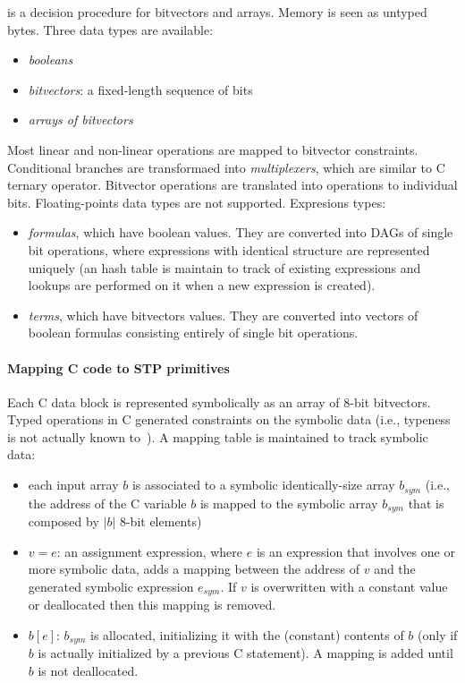 \cite{STP-TR07} is a decision procedure for bitvectors and arrays. Memory is seen as untyped bytes. Three data types are available:
\begin{itemize}
  \item {\em booleans}
  \item {\em bitvectors}: a fixed-length sequence of bits
  \item {\em arrays of bitvectors}
\end{itemize}
Most linear and non-linear operations are mapped to bitvector constraints. Conditional branches are transformaed into {\em multiplexers}, which are similar to C ternary operator. Bitvector operations are translated into operations to individual bits. Floating-points data types are not supported. Expresions types:
\begin{itemize}
  \item {\em formulas}, which have boolean values. They are converted into DAGs of single bit operations, where expressions with identical structure are represented uniquely (an hash table is maintain to track of existing expressions and lookups are performed on it when a new expression is created).
  \item {\em terms}, which have bitvectors values. They are converted into vectors of boolean formulas consisting entirely of single bit operations.
\end{itemize}

\paragraph{Mapping C code to STP primitives} Each C data block is represented symbolically as an array of 8-bit bitvectors. Typed operations in C generated constraints on the symbolic data (i.e., typeness is not actually known to~\cite{STP-TR07}). A mapping table is maintained to track symbolic data:
\begin{itemize}
  \item each input array $b$ is associated to a symbolic identically-size array $b_{sym}$ (i.e., the address of the C variable $b$ is mapped to the symbolic array $b_{sym}$ that is composed by $|b|$ 8-bit elements)
  \item $v = e$: an assignment expression, where $e$ is an expression that involves one or more symbolic data, adds a mapping between the address of $v$ and the generated symbolic expression $e_{sym}$. If $v$ is overwritten with a constant value or deallocated then this mapping is removed.
  \item $b[e]$: $b_{sym}$ is allocated, initializing it with the (constant) contents of $b$ (only if $b$ is actually initialized by a previous C statement). A mapping is added until $b$ is not deallocated.
\end{itemize}


